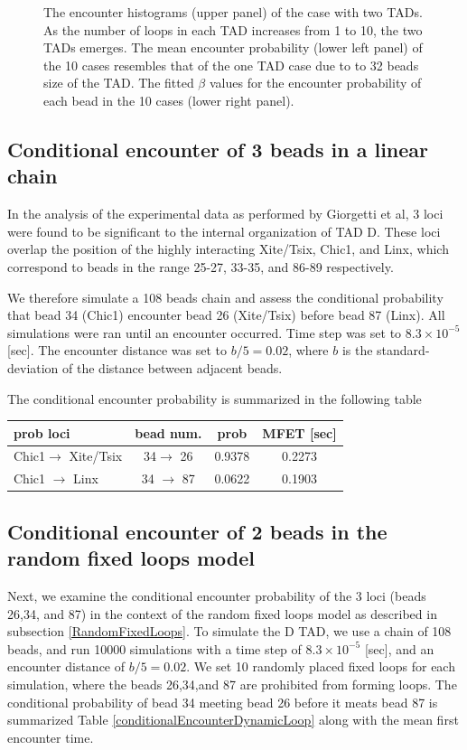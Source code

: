 \documentclass[12pt]{paper}
\begin{document}
\begin{figure}[H]
\caption{\scriptsize{The encounter histograms (upper panel) of the case with two TADs. As the number of loops in each TAD increases from 1 to 10, the two TADs emerges. The mean encounter probability (lower left panel) of the 10 cases resembles that of the one TAD case due to to 32 beads size of the TAD. The fitted $\beta$ values for the encounter probability of each bead in the 10 cases (lower right panel).}}
\end{figure}
 
\subsection{Conditional encounter of 3 beads in a linear chain}

In the analysis of the experimental data as performed by Giorgetti et al, 3 loci were found to be significant to the internal organization of TAD D. These loci overlap the position of the highly interacting Xite/Tsix, Chic1, and Linx, which correspond to beads in the range 25-27, 33-35, and 86-89 respectively.

We therefore simulate a 108 beads chain and assess the conditional probability that  bead 34 (Chic1) encounter bead 26 (Xite/Tsix) before bead 87 (Linx). All simulations were ran until an encounter occurred. Time step was set to $8.3\times 10^{-5}$ [sec]. The encounter distance was set to $b/5=0.02$, where $b$ is the standard-deviation of the distance between adjacent beads. 

The conditional encounter probability is summarized in the following table 
\begin{table}[H]
\begin{tabular}{l |c| c |c |}
 prob loci & bead num. &prob & MFET [sec]\\
\hline
 Chic1$\rightarrow$ Xite/Tsix & 34$\rightarrow$ 26 & 0.9378 & 0.2273\\
 Chic1 $\rightarrow$ Linx     & 34 $\rightarrow$ 87 & 0.0622 & 0.1903

\end{tabular}

\end{table}


\subsection{Conditional encounter of 2 beads in the random fixed loops model}
Next, we examine the conditional encounter probability of the 3 loci (beads 26,34, and 87) in the context of the random fixed loops model as described in subsection \ref{RandomFixedLoops}. To simulate the D TAD, we use a chain of 108 beads, and run 10000 simulations with a time step of $8.3\times 10^{-5}$ [sec], and an encounter distance of $b/5=0.02$. We set 10 randomly placed fixed loops for each simulation, where the beads 26,34,and 87 are prohibited from forming loops. The conditional probability of bead 34 meeting bead 26 before it meats bead 87 is summarized Table \ref{conditionalEncounterDynamicLoop} along with the mean first encounter time.
\end{document}
